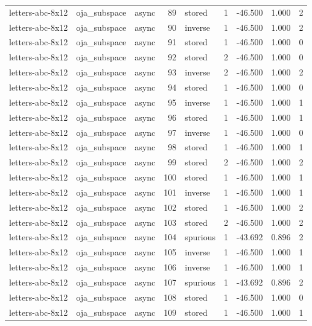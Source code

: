 \begin{tabular}{lllrlrrrr}
letters-abc-8x12 & oja\_subspace & async & 89 & stored & 1 & -46.500 & 1.000 & 2 \\
letters-abc-8x12 & oja\_subspace & async & 90 & inverse & 1 & -46.500 & 1.000 & 2 \\
letters-abc-8x12 & oja\_subspace & async & 91 & stored & 1 & -46.500 & 1.000 & 0 \\
letters-abc-8x12 & oja\_subspace & async & 92 & stored & 2 & -46.500 & 1.000 & 0 \\
letters-abc-8x12 & oja\_subspace & async & 93 & inverse & 2 & -46.500 & 1.000 & 2 \\
letters-abc-8x12 & oja\_subspace & async & 94 & stored & 1 & -46.500 & 1.000 & 0 \\
letters-abc-8x12 & oja\_subspace & async & 95 & inverse & 1 & -46.500 & 1.000 & 1 \\
letters-abc-8x12 & oja\_subspace & async & 96 & stored & 1 & -46.500 & 1.000 & 1 \\
letters-abc-8x12 & oja\_subspace & async & 97 & inverse & 1 & -46.500 & 1.000 & 0 \\
letters-abc-8x12 & oja\_subspace & async & 98 & stored & 1 & -46.500 & 1.000 & 1 \\
letters-abc-8x12 & oja\_subspace & async & 99 & stored & 2 & -46.500 & 1.000 & 2 \\
letters-abc-8x12 & oja\_subspace & async & 100 & stored & 1 & -46.500 & 1.000 & 1 \\
letters-abc-8x12 & oja\_subspace & async & 101 & inverse & 1 & -46.500 & 1.000 & 1 \\
letters-abc-8x12 & oja\_subspace & async & 102 & stored & 1 & -46.500 & 1.000 & 2 \\
letters-abc-8x12 & oja\_subspace & async & 103 & stored & 2 & -46.500 & 1.000 & 2 \\
letters-abc-8x12 & oja\_subspace & async & 104 & spurious & 1 & -43.692 & 0.896 & 2 \\
letters-abc-8x12 & oja\_subspace & async & 105 & inverse & 1 & -46.500 & 1.000 & 1 \\
letters-abc-8x12 & oja\_subspace & async & 106 & inverse & 1 & -46.500 & 1.000 & 1 \\
letters-abc-8x12 & oja\_subspace & async & 107 & spurious & 1 & -43.692 & 0.896 & 2 \\
letters-abc-8x12 & oja\_subspace & async & 108 & stored & 1 & -46.500 & 1.000 & 0 \\
letters-abc-8x12 & oja\_subspace & async & 109 & stored & 1 & -46.500 & 1.000 & 1 \\

\end{tabular}
